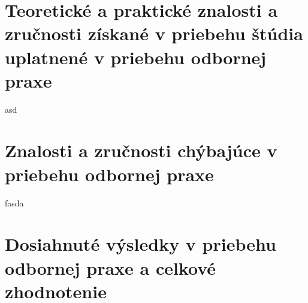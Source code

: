 \documentclass[slovak, bachelorpractice]{diploma}
\begin{document}
\section{Teoretické a praktické znalosti a zručnosti získané v priebehu štúdia uplatnené v priebehu odbornej praxe}
asd
\label{sec:techZruc}
\section{Znalosti a zručnosti chýbajúce v priebehu odbornej praxe}
\label{sec:coNeviem}
fasda
\section{Dosiahnuté výsledky v priebehu odbornej praxe a celkové zhodnotenie}
\label{sec:Results}

\printbibliography[title={Literatúra}, heading=bibintoc]

%
\end{document}
